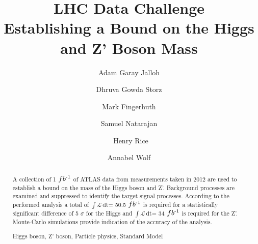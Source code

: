 \documentclass[runningheads,a4paper]{llncs}
\newcommand{\invfb}{fb\textsuperscript{-1}}
\newcommand{\lumi}{$\int \mathcal{L} \, \mathrm{dt}$}
\newcommand{\keywords}[1]{\par\addvspace\baselineskip
\noindent\keywordname\enspace\ignorespaces#1}
\begin{document}
\mainmatter  %

\title{LHC Data Challenge\\Establishing a Bound on the Higgs and Z' Boson Mass}


%
%
\author{Adam Garay Jalloh%
\and Dhruva Gowda Storz\and Mark Fingerhuth\and Samuel Natarajan\and\ Henry Rice\and Annabel Wolf}
%


%
%

\maketitle


\begin{abstract}
A collection of 1 $\invfb$ of ATLAS data from measurements taken in 2012 are used to establish a bound on the mass of the Higgs boson and Z'. Background processes are examined and suppressed to identify the target signal processes. According to the performed analysis a total of \lumi = 50.5 $\invfb$ is required for a statistically significant difference of 5 $\sigma$ for the Higgs and \lumi = 34 $\invfb$ is required for the Z'. Monte-Carlo simulations provide indication of the accuracy of the analysis.\\

\keywords{Higgs boson, Z' boson, Particle physics, Standard Model}
\end{abstract}
\vspace{12mm}
\end{document}
